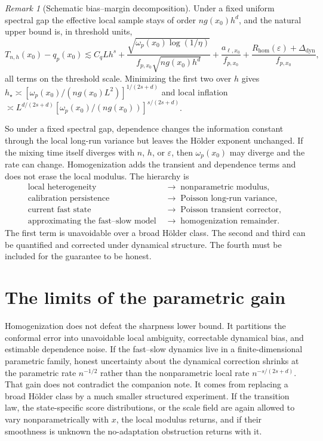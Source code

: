\documentclass[11pt]{article}
\theoremstyle{definition}
\theoremstyle{remark}
\newtheorem{remark}[theorem]{Remark}
\begin{document}
\begin{remark}[Schematic bias--margin decomposition]\label{rem:schematic}
Under a fixed uniform spectral gap the effective local sample stays of order $n g(x_0)h^d$,
and the natural upper bound is, in threshold units,
\begin{equation}\label{eq:hierarchy-bound}
  T_{n,h}(x_0) - q_p(x_0) \lesssim
    C_q L h^{s}
    + \frac{\sqrt{\omega_p(x_0)\log(1/\eta)}}{f_{p,x_0}\sqrt{n g(x_0) h^{d}}}
    + \frac{a_{\ell,x_0}}{f_{p,x_0}}
    + \frac{R_{\mathrm{hom}}(\varepsilon) + \Delta_{\mathrm{dyn}}}{f_{p,x_0}} ,
\end{equation}
all terms on the threshold scale. Minimizing the first two over $h$ gives $h_\star\asymp
[\omega_p(x_0)/(n g(x_0)L^2)]^{1/(2s+d)}$ and local inflation $\asymp L^{d/(2s+d)}
[\omega_p(x_0)/(n g(x_0))]^{s/(2s+d)}$.
\end{remark}

So under a fixed spectral gap, dependence changes the information constant through the local
long-run variance but leaves the H\"older exponent unchanged. If the mixing time itself
diverges with $n$, $h$, or $\varepsilon$, then $\omega_p(x_0)$ may diverge and the rate can
change. Homogenization adds the transient and dependence terms and does not erase the local
modulus. The hierarchy is
\begin{equation}\label{eq:hierarchy}
  \begin{aligned}
    \text{local heterogeneity} &\;\to\; \text{nonparametric modulus},\\
    \text{calibration persistence} &\;\to\; \text{Poisson long-run variance},\\
    \text{current fast state} &\;\to\; \text{Poisson transient corrector},\\
    \text{approximating the fast--slow model} &\;\to\; \text{homogenization remainder}.
  \end{aligned}
\end{equation}
The first term is unavoidable over a broad H\"older class. The second and third can be
quantified and corrected under dynamical structure. The fourth must be included for the
guarantee to be honest.

\section{The limits of the parametric gain}\label{sec:whatbuys}

Homogenization does not defeat the sharpness lower bound. It partitions the conformal error
into unavoidable local ambiguity, correctable dynamical bias, and estimable dependence noise.
If the fast--slow dynamics live in a finite-dimensional parametric family, honest uncertainty
about the dynamical correction shrinks at the parametric rate $n^{-1/2}$ rather than the
nonparametric local rate $n^{-s/(2s+d)}$. That gain does not contradict the companion note. It
comes from replacing a broad H\"older class by a much smaller structured experiment. If the
transition law, the state-specific score distributions, or the scale field are again allowed
to vary nonparametrically with $x$, the local modulus returns, and if their smoothness is
unknown the no-adaptation obstruction returns with it.
\end{document}
